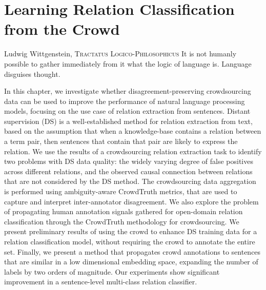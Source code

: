 \chapter{Learning Relation Classification from the Crowd}
\label{chap:od-rel-ex}


\begin{chapquote}{Ludwig Wittgenstein, \textsc{Tractatus Logico-Philosophicus}}
It is not humanly possible to gather immediately from it what the logic of language is. Language disguises thought.
\end{chapquote}


In this chapter, we investigate whether disagreement-preserving crowdsourcing data can be used to improve the performance of natural language processing models, focusing on the use case of relation extraction from sentences. Distant supervision (DS) is a well-established method for relation extraction from text, based on the assumption that when a knowledge-base contains a relation between a term pair, then sentences that contain that pair are likely to express the relation. We use the results of a crowdsourcing relation extraction task to identify two problems with DS data quality: the widely varying degree of false positives across different relations, and the observed causal connection between relations that are not considered by the DS method. The crowdsourcing data aggregation is performed using ambiguity-aware CrowdTruth metrics, that are used to capture and interpret inter-annotator disagreement. We also explore the problem of propagating human annotation signals gathered for open-domain relation classification through the CrowdTruth methodology for crowdsourcing. We present preliminary results of using the crowd to enhance DS training data for a relation classification model, without requiring the crowd to annotate the entire set. Finally, we present a method that propagates crowd annotations to sentences that are similar in a low dimensional embedding space, expanding the number of labels by two orders of magnitude. Our experiments show significant improvement in a sentence-level multi-class relation classifier.

